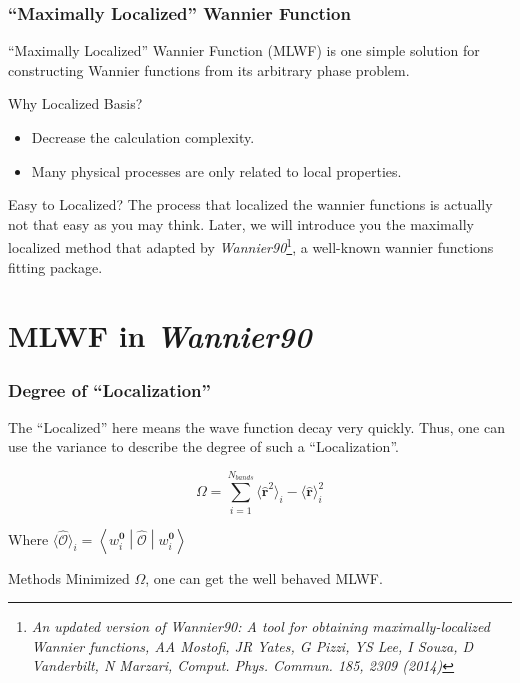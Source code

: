 \documentclass{beamer}
\begin{document}
  \begin{frame}
    \frametitle{``Maximally Localized'' Wannier Function}

    ``Maximally Localized'' Wannier Function (MLWF) is one simple solution for constructing Wannier functions from its arbitrary phase problem.
    
    \begin{block}{Why Localized Basis?}
      \begin{itemize}
        \item Decrease the calculation complexity. 
        \item Many physical processes are only related to local properties.
      \end{itemize}
    \end{block}

    \begin{block}{Easy to Localized?}
      The process that localized the wannier functions is actually not that easy as you may think. Later, we will introduce you the maximally localized method that adapted by \emph{Wannier90}\footnote{\tiny\emph{An updated version of \emph{Wannier90}: A tool for obtaining maximally-localized Wannier functions, AA Mostofi, JR Yates, G Pizzi, YS Lee, I Souza, D Vanderbilt, N Marzari, Comput. Phys. Commun. 185, 2309 (2014) }}, a well-known wannier functions fitting package.
    \end{block}

  \end{frame}

  \section{MLWF in \emph{Wannier90}}

  \begin{frame}
    \frametitle{Degree of ``Localization''}
    
    The ``Localized'' here means the wave function decay very quickly. Thus, one can use the variance to describe the degree of such a ``Localization''.

    \begin{equation}
        \Omega = \sum_{i=1}^{N_{bands}}\langle\widehat{\mathbf{r}}^2\rangle_i-\langle\widehat{\mathbf{r}}\rangle_i^2
    \end{equation}
    
    Where \(\langle\widehat{\mathcal{O}}\rangle_i = \left\langle{}w_i^\mathbf{0}\middle|\widehat{\mathcal{O}}\middle|w_i^\mathbf{0}\right\rangle\)
    \begin{block}{Methods}
      Minimized \(\Omega\), one can get the well behaved MLWF. 
    \end{block}
    
  \end{frame}
\end{document}

